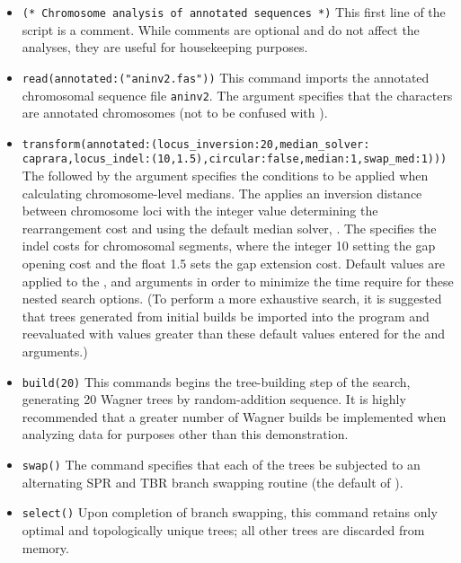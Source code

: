 \begin{itemize}
\item \texttt{(* Chromosome analysis of annotated sequences  *)} This first line of the script is a comment. While 
comments are optional and do not affect the analyses, they are useful for housekeeping purposes.
\item \texttt{read(annotated:("aninv2.fas"))} This command imports the annotated chromosomal sequence file 
\texttt{aninv2}. The argument  specifies that the characters are annotated chromosomes
(not to be confused with ). 
\item \texttt{transform(annotated:(locus\_inversion:20,median\_solver:\\ caprara,locus\_indel:(10,1.5),circular:false,median:1,swap\_med:1)))}  
The  follow\-ed by the argument  specifies the conditions to be applied 
when calculating chromosome-level medians.  
The  applies an inversion distance between chromosome loci with 
the integer value determining the rearrangement cost and using the default median solver, . 
The  specifies the indel costs 
for chromosomal segments, where the integer 10 setting the gap opening cost and the float 1.5 sets the gap extension 
cost.  Default values are applied to the ,   and 
 arguments in order to minimize the time require for these nested search options. 
(To perform a more exhaustive search, it is suggested that trees generated from initial builds be imported into the program and 
reevaluated with values greater than these default values entered for the  and  
arguments.)
\item \texttt{build(20)} This commands begins the tree-building step of the search, generating 20 Wagner trees by random-addition 
sequence.  It is highly recommended that a greater number of Wagner builds be implemented when analyzing 
data for purposes other than this demonstration.
\item \texttt{swap()} The  command specifies that each of the trees be subjected to an alternating 
SPR and TBR branch swapping routine (the default of \poy).
\item \texttt{select()} Upon completion of branch swapping, this command retains only optimal and topologically 
unique trees; all other trees are discarded from memory. 

\end{itemize}

